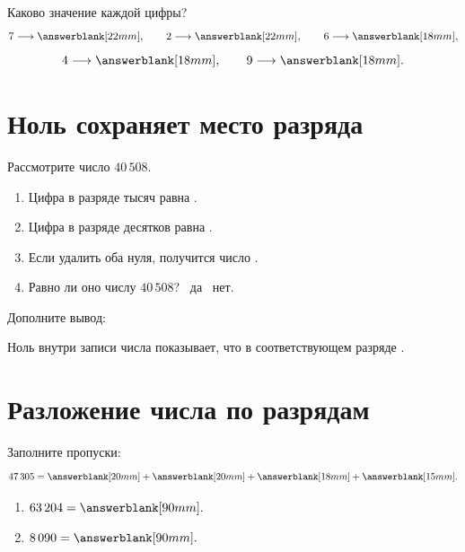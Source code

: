 Каково значение каждой цифры?
\[
  7\longrightarrow\answerblank[22mm],\qquad
  2\longrightarrow\answerblank[22mm],\qquad
  6\longrightarrow\answerblank[18mm],
\]
\[
  4\longrightarrow\answerblank[18mm],\qquad
  9\longrightarrow\answerblank[18mm].
\]

\section{Ноль сохраняет место разряда}

Рассмотрите число \(40\,508\).

\zeroplacefigure

\begin{checkpointbox}
  \begin{enumerate}
    \item Цифра в разряде тысяч равна \answerblank[12mm].
    \item Цифра в разряде десятков равна \answerblank[12mm].
    \item Если удалить оба нуля, получится число \answerblank[20mm].
    \item Равно ли оно числу \(40\,508\)?
      \choicebox\ да \qquad \choicebox\ нет.
  \end{enumerate}
\end{checkpointbox}

Дополните вывод:

\begin{reflectionbox}
  Ноль внутри записи числа показывает, что в соответствующем разряде
  \answerblank[75mm].
\end{reflectionbox}

\section{Разложение числа по разрядам}

\expandedformfigure

Заполните пропуски:
\[
  47\,305=
  \answerblank[20mm]+\answerblank[20mm]+\answerblank[18mm]+\answerblank[15mm].
\]

\begin{fillbox}
  \begin{enumerate}
    \item \(63\,204=\answerblank[90mm].\)
    \item \(8\,090=\answerblank[90mm].\)
  \end{enumerate}
\end{fillbox}

